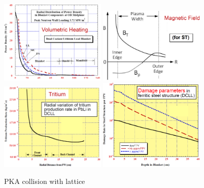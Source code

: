 \documentclass[11pt]{article}
\begin{document}
\begin{figure}[h!]
  \includegraphics[width=0.45\textwidth]{figs/fig4.png}
  \includegraphics[width=0.45\textwidth]{figs/fig6.png}
  \includegraphics[width=0.45\textwidth]{figs/fig5.png}
  \includegraphics[width=0.45\textwidth]{figs/fig7.png}
  \caption{PKA collision with lattice}
\end{figure}
\end{document}
